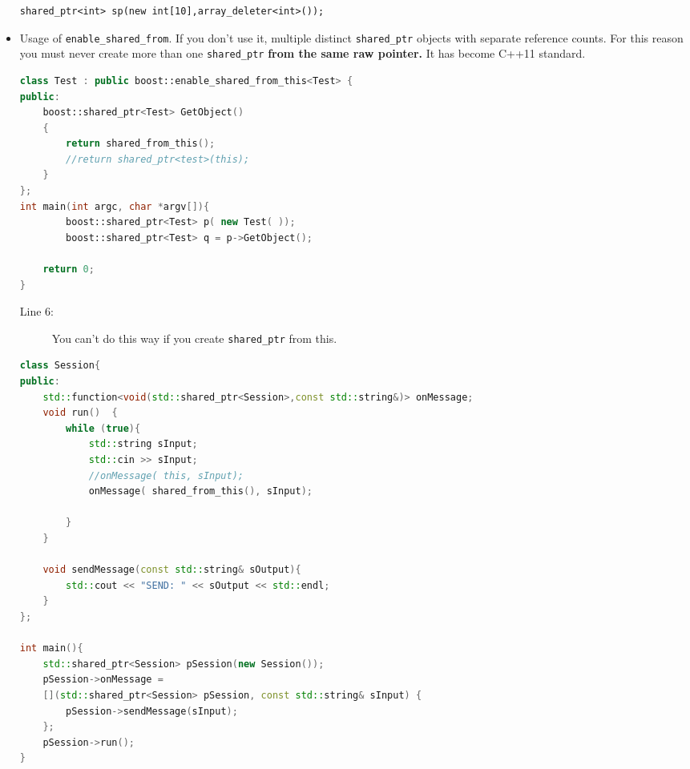 \documentclass[a4paper,11pt,twoside]{book}
\begin{document}
\begin{itemize}
\begin{lstlisting}[numbers=none]
shared_ptr<int> sp(new int[10],array_deleter<int>());
\end{lstlisting}

\item Usage of \texttt{enable\_shared\_from}. If you don't use it, multiple distinct \texttt{shared\_ptr} objects with separate reference counts. For this reason you must never create more than one \texttt{shared\_ptr} \textbf{from the same raw pointer.} It has become C++11 standard.
\begin{lstlisting}[frame=single, language=c++]
class Test : public boost::enable_shared_from_this<Test> {
public:
    boost::shared_ptr<Test> GetObject()
    {
        return shared_from_this();
        //return shared_ptr<test>(this);
    }
};
int main(int argc, char *argv[]){
        boost::shared_ptr<Test> p( new Test( ));
        boost::shared_ptr<Test> q = p->GetObject();
    
    return 0;
}
\end{lstlisting}
\begin{description}
	\item[Line 6:] You can't do this way if you create \texttt{shared\_ptr} from this.
\end{description}

\begin{lstlisting}[frame=single, language=c++]
class Session{
public:
	std::function<void(std::shared_ptr<Session>,const std::string&)> onMessage;
	void run()	{
		while (true){
			std::string sInput;
			std::cin >> sInput;
			//onMessage( this, sInput);
			onMessage( shared_from_this(), sInput);
			
		}
	}
	
	void sendMessage(const std::string& sOutput){
		std::cout << "SEND: " << sOutput << std::endl;
	}
};

int main(){
	std::shared_ptr<Session> pSession(new Session());
	pSession->onMessage = 
	[](std::shared_ptr<Session> pSession, const std::string& sInput) {
		pSession->sendMessage(sInput);
	};
	pSession->run();
}
\end{lstlisting}

\end{itemize}
\end{document}
